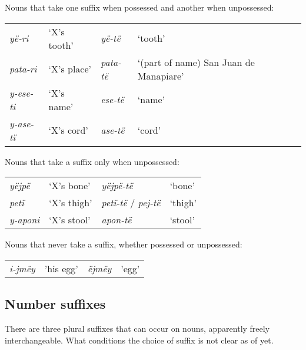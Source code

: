 \documentclass{memoir}
\begin{document}
\ex\label{diffpossessed} Nouns that take one suffix when possessed and
another when unpossessed:

\begin{tabular}[t]{llll}

   \emph{yë-ri} & ‘X’s tooth’ &   \emph{yë-të} &                                ‘tooth’ \\

 \emph{pata-ri} & ‘X’s place’ & \emph{pata-të} & ‘(part of name) San Juan de Manapiare’ \\
\emph{y-ese-ti} & ‘X’s name’  &  \emph{ese-të} &                                 ‘name’ \\
\emph{y-ase-tï} & ‘X’s cord’  &  \emph{ase-të} &                                 ‘cord’ \\

\end{tabular}
 \xe

\ex\label{suffunpossessed} Nouns that take a suffix only when
unpossessed:

\begin{tabular}[t]{llll}

  \emph{yëjpë} &  ‘X’s bone’ &                \emph{yëjpë-të} &  ‘bone’ \\

   \emph{petï} & ‘X’s thigh’ & \emph{petï-të} / \emph{pej-të} & ‘thigh’ \\
\emph{y-aponi} & ‘X’s stool’ &                 \emph{apon-të} & ‘stool’ \\

\end{tabular}
 \xe

\ex\label{unsuffixednouns} Nouns that never take a suffix, whether
possessed or unpossessed:

\begin{tabular}[t]{llll}

\emph{i-jmëy} & 'his egg’ & \emph{ëjmëy} & 'egg’ \\

\end{tabular}
 \xe

\subsection{\texorpdfstring{Number suffixes
\label{sec:nominalnumber}}{Number suffixes }}

There are three plural suffixes that can occur on nouns, apparently
freely interchangeable. What conditions the choice of suffix is not
clear as of yet.
\end{document}

